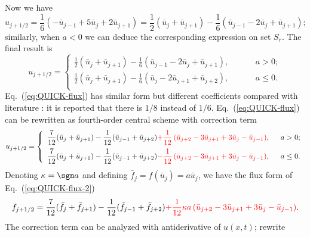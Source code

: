 \documentclass[]{article}
\begin{document}
Now we have
\[u_{j+1/2}=\frac{1}{6}(-\bar u_{j-1}+5\bar u_j+2\bar u_{j+1})=\frac{1}{2}(\bar
u_j+\bar u_{j+1})-\frac{1}{6}(\bar u_{j-1}-2\bar u_j+\bar u_{j+1});\]
similarly, when $a<0$ we can deduce the corresponding expression on set
$S_r$. The final result is
\begin{equation}
    u_{j+1/2}=\left\{\begin{array}{ll}
	\displaystyle
	\frac{1}{2}(\bar u_j+\bar u_{j+1})-\frac{1}{6}(\bar u_{j-1}-2\bar u_j+\bar u_{j+1}),\hspace{1cm} & a>0;\\[3mm]
	\displaystyle
	\frac{1}{2}(\bar u_j+\bar u_{j+1})-\frac{1}{6}(\bar u_j-2\bar u_{j+1}+\bar u_{j+2}),\hspace{1cm} & a\le 0.\\
    \end{array}\right.
    \label{eq:QUICK-flux}
\end{equation}
Eq.~(\ref{eq:QUICK-flux}) has similar form but different coefficients compared
with literature \cite{leonard1979stable}: it is reported that there is $1/8$
instead of $1/6$.
Eq.~(\ref{eq:QUICK-flux}) can be rewritten as fourth-order central scheme with
correction term
\begin{equation}
    u_{j+1/2}=\left\{\begin{array}{ll}
	\displaystyle
	\frac{7}{12}(\bar u_j+\bar u_{j+1})-\frac{1}{12}(\bar u_{j-1}+\bar u_{j+2}){\color{red}+\frac{1}{12}\left(\bar u_{j+2}-3\bar u_{j+1}+3\bar u_{j}-\bar u_{j-1} \right)}     ,\hspace{2mm} & a>0;\\[3mm]
	\displaystyle
	\frac{7}{12}(\bar u_j+\bar u_{j+1})-\frac{1}{12}(\bar u_{j-1}+\bar u_{j+2}){\color{red}-\frac{1}{12}\left(\bar u_{j+2}-3\bar u_{j+1}+3\bar u_{j}-\bar u_{j-1} \right)}     ,\hspace{2mm} & a\le 0.\\
    \end{array}\right.
    \label{eq:QUICK-flux-2}
\end{equation}
Denoting $\kappa = \sgn a$ and defining $\bar f_j = f(\bar u_j) = a\bar u_j$, we
have the flux form of Eq.~(\ref{eq:QUICK-flux-2})
\begin{equation}
    f_{j+1/2}=
    \frac{7}{12}(\bar f_j+\bar f_{j+1})-\frac{1}{12}(\bar f_{j-1}+\bar
    f_{j+2}){\color{red}+\frac{1}{12}\kappa a\left(\bar u_{j+2}-3\bar u_{j+1}+3\bar
    u_{j}-\bar u_{j-1} \right)}.
    \label{eq:QUICK-flux-3}
\end{equation}
The correction term can be analyzed with antiderivative of $u(x,t)$; rewrite
\end{document}
